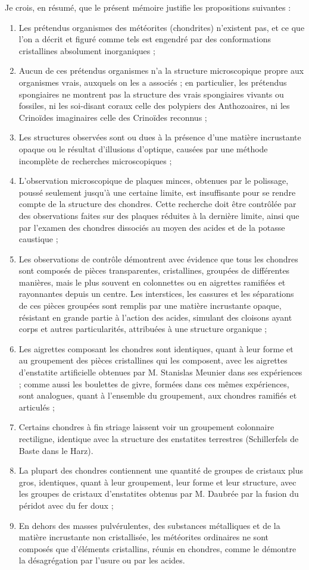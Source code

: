 \documentclass[a4paper, 12pt, oneside, french]{article}
\begin{document}
Je crois, en résumé, que le présent mémoire justifie les propositions suivantes :
\begin{enumerate}
\item Les prétendus organismes des météorites (chondrites) n'existent pas, et ce que l'on a décrit et figuré comme tels est engendré par des conformations cristallines absolument inorganiques ;
\item Aucun de ces prétendus organismes n'a la structure microscopique propre aux organismes vrais, auxquels on les a associés ; en particulier, les prétendus spongiaires ne montrent pas la structure des vrais spongiaires vivants ou fossiles, ni les soi-disant coraux celle des polypiers des Anthozoaires, ni les Crinoïdes imaginaires celle des Crinoïdes reconnus ;
\item Les structures observées sont ou dues à la présence d'une matière incrustante opaque ou le résultat d'illusions d'optique, causées par une méthode incomplète de recherches microscopiques ;
\item L'observation microscopique de plaques minces, obtenues par le polissage, poussé seulement jusqu'à une certaine limite, est insuffisante pour se rendre compte de la structure des chondres. Cette recherche doit être contrôlée par des observations faites sur des plaques réduites à la dernière limite, ainsi que par l'examen des chondres dissociés au moyen des acides et de la potasse caustique ;
\item Les observations de contrôle démontrent avec évidence que tous les chondres sont composés de pièces transparentes, cristallines, groupées de différentes manières, mais le plus souvent en colonnettes ou en aigrettes ramifiées et rayonnantes depuis un centre. Les interstices, les cassures et les séparations de ces pièces groupées sont remplis par une matière incrustante opaque, résistant en grande partie à l'action des acides, simulant des cloisons \og ayant corps \fg et autres particularités, attribuées à une structure organique ;
\item Les aigrettes composant les chondres sont identiques, quant à leur forme et au groupement des pièces cristallines qui les composent, avec les aigrettes d'enstatite artificielle obtenues par M. Stanislas Meunier dans ses expériences ; comme aussi les boulettes de givre, formées dans ces mêmes expériences, sont analogues, quant à l'ensemble du groupement, aux chondres ramifiés et articulés ;
\item Certains chondres à fin striage laissent voir un groupement colonnaire rectiligne, identique avec la structure des enstatites terrestres (Schillerfels de Baste dans le Harz).
\item La plupart des chondres contiennent une quantité de groupes de cristaux plus gros, identiques, quant à leur groupement, leur forme et leur structure, avec les groupes de cristaux d'enstatites obtenus par M. Daubrée par la fusion du péridot avec du fer doux ;
\item En dehors des masses pulvérulentes, des substances métalliques et de la matière incrustante non cristallisée, les météorites ordinaires ne sont composés que d'éléments cristallins, réunis en chondres, comme le démontre la désagrégation par l'usure ou par les acides.
\end{enumerate}
\end{document}
